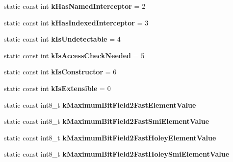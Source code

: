 \begin{DoxyCompactItemize}
\item 
static const int {\bfseries k\+Has\+Named\+Interceptor} = 2\hypertarget{classv8_1_1internal_1_1_map_ae1bcc8aebd00c892cc929c10bcda0239}{}\label{classv8_1_1internal_1_1_map_ae1bcc8aebd00c892cc929c10bcda0239}

\item 
static const int {\bfseries k\+Has\+Indexed\+Interceptor} = 3\hypertarget{classv8_1_1internal_1_1_map_a2fb730e0d0fa7622af6a0cc07386fc6b}{}\label{classv8_1_1internal_1_1_map_a2fb730e0d0fa7622af6a0cc07386fc6b}

\item 
static const int {\bfseries k\+Is\+Undetectable} = 4\hypertarget{classv8_1_1internal_1_1_map_a23419f5d3c0c3bdecfd11e8d67649ab5}{}\label{classv8_1_1internal_1_1_map_a23419f5d3c0c3bdecfd11e8d67649ab5}

\item 
static const int {\bfseries k\+Is\+Access\+Check\+Needed} = 5\hypertarget{classv8_1_1internal_1_1_map_a4166f71f4987249578dabb3e24b8f4e7}{}\label{classv8_1_1internal_1_1_map_a4166f71f4987249578dabb3e24b8f4e7}

\item 
static const int {\bfseries k\+Is\+Constructor} = 6\hypertarget{classv8_1_1internal_1_1_map_a86536be2487dd33f79f8873907734286}{}\label{classv8_1_1internal_1_1_map_a86536be2487dd33f79f8873907734286}

\item 
static const int {\bfseries k\+Is\+Extensible} = 0\hypertarget{classv8_1_1internal_1_1_map_a022e2df17d0a2b317d930dad7cba8f7d}{}\label{classv8_1_1internal_1_1_map_a022e2df17d0a2b317d930dad7cba8f7d}

\item 
static const int8\+\_\+t {\bfseries k\+Maximum\+Bit\+Field2\+Fast\+Element\+Value}
\item 
static const int8\+\_\+t {\bfseries k\+Maximum\+Bit\+Field2\+Fast\+Smi\+Element\+Value}
\item 
static const int8\+\_\+t {\bfseries k\+Maximum\+Bit\+Field2\+Fast\+Holey\+Element\+Value}
\item 
static const int8\+\_\+t {\bfseries k\+Maximum\+Bit\+Field2\+Fast\+Holey\+Smi\+Element\+Value}
\end{DoxyCompactItemize}
